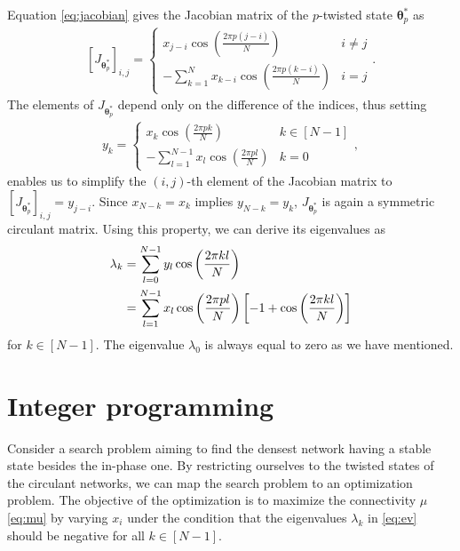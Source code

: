 Equation \eqref{eq:jacobian} gives the Jacobian matrix of the $p$-twisted state $\bm{\theta}_{p}^{\ast}$ as
\begin{align}
    \left[J_{\bm{\theta}_{p}^{\ast}}\right]_{i,j} = \left\{
    \begin{array}{ll}
        \displaystyle x_{j-i}\cos\left(\frac{2\pi p(j-i)}{N}\right) & i\ne j \\
        -\displaystyle\sum_{k=1}^{N}x_{k-i}\cos\left(\frac{2\pi p(k-i)}{N}\right) & i = j
    \end{array}
    \right. .
\end{align}
The elements of $J_{\bm{\theta}_{p}^{\ast}}$ depend only on the difference of the indices, thus setting
\begin{align}
    y_{k} = \left\{
    \begin{array}{ll}
        \displaystyle x_{k}\cos\left(\frac{2\pi pk}{N}\right) & k\in[N-1] \\
        -\displaystyle\sum_{l=1}^{N-1}x_{l}\cos\left(\frac{2\pi pl}{N}\right) & k=0
    \end{array}
    \right. ,
\end{align}
enables us to simplify the $(i,j)$-th element of the Jacobian matrix to $\left[J_{\bm{\theta}_{p}^{\ast}}\right]_{i,j} = y_{j-i}$.
Since $x_{N-k}=x_{k}$ implies $y_{N-k}=y_{k}$, $J_{\bm{\theta}_{p}^{\ast}}$ is again a symmetric circulant matrix. Using this property, we can derive its eigenvalues as
\begin{align}
    \lambda_{k}&=\sum_{l=0}^{N-1}y_{l}\cos\left(\frac{2\pi kl}{N}\right)\notag\\
    &=\sum_{l=1}^{N-1}x_{l}\cos\left(\frac{2\pi pl}{N}\right)\left[-1+\cos\left(\frac{2\pi kl}{N}\right)\right]\label{eq:ev}
\end{align}
for $k\in[N-1]$. The eigenvalue $\lambda_{0}$ is always equal to zero as we have mentioned.

\section{Integer programming}
\label{sec:integer-programming}
Consider a search problem aiming to find the densest network having a stable state besides the in-phase one. By restricting ourselves to the twisted states of the circulant networks, we can map the search problem to an optimization problem. The objective of the optimization is to maximize the connectivity $\mu$ \eqref{eq:mu} by varying $x_{i}$ under the condition that the eigenvalues $\lambda_{k}$ in \eqref{eq:ev} should be negative for all $k\in[N-1]$.

